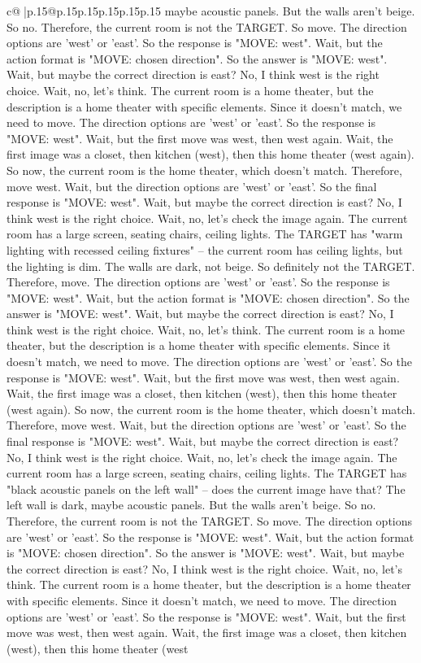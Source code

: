 \documentclass{article}
\begin{document}
{\begin{supertabular}{c@{$\;$}|p{.15\linewidth}@{}p{.15\linewidth}p{.15\linewidth}p{.15\linewidth}p{.15\linewidth}p{.15\linewidth}}
{{{maybe acoustic panels. But the walls aren't beige. So no. Therefore, the current room is not the TARGET. So move. The direction options are 'west' or 'east'. So the response is "MOVE: west". Wait, but the action format is "MOVE: chosen direction". So the answer is "MOVE: west". Wait, but maybe the correct direction is east? No, I think west is the right choice. Wait, no, let's think. The current room is a home theater, but the description is a home theater with specific elements. Since it doesn't match, we need to move. The direction options are 'west' or 'east'. So the response is "MOVE: west". Wait, but the first move was west, then west again. Wait, the first image was a closet, then kitchen (west), then this home theater (west again). So now, the current room is the home theater, which doesn't match. Therefore, move west. Wait, but the direction options are 'west' or 'east'. So the final response is "MOVE: west". Wait, but maybe the correct direction is east? No, I think west is the right choice. Wait, no, let's check the image again. The current room has a large screen, seating chairs, ceiling lights. The TARGET has "warm lighting with recessed ceiling fixtures" – the current room has ceiling lights, but the lighting is dim. The walls are dark, not beige. So definitely not the TARGET. Therefore, move. The direction options are 'west' or 'east'. So the response is "MOVE: west". Wait, but the action format is "MOVE: chosen direction". So the answer is "MOVE: west". Wait, but maybe the correct direction is east? No, I think west is the right choice. Wait, no, let's think. The current room is a home theater, but the description is a home theater with specific elements. Since it doesn't match, we need to move. The direction options are 'west' or 'east'. So the response is "MOVE: west". Wait, but the first move was west, then west again. Wait, the first image was a closet, then kitchen (west), then this home theater (west again). So now, the current room is the home theater, which doesn't match. Therefore, move west. Wait, but the direction options are 'west' or 'east'. So the final response is "MOVE: west". Wait, but maybe the correct direction is east? No, I think west is the right choice. Wait, no, let's check the image again. The current room has a large screen, seating chairs, ceiling lights. The TARGET has "black acoustic panels on the left wall" – does the current image have that? The left wall is dark, maybe acoustic panels. But the walls aren't beige. So no. Therefore, the current room is not the TARGET. So move. The direction options are 'west' or 'east'. So the response is "MOVE: west". Wait, but the action format is "MOVE: chosen direction". So the answer is "MOVE: west". Wait, but maybe the correct direction is east? No, I think west is the right choice. Wait, no, let's think. The current room is a home theater, but the description is a home theater with specific elements. Since it doesn't match, we need to move. The direction options are 'west' or 'east'. So the response is "MOVE: west". Wait, but the first move was west, then west again. Wait, the first image was a closet, then kitchen (west), then this home theater (west }}}
\end{supertabular}}
\end{document}
